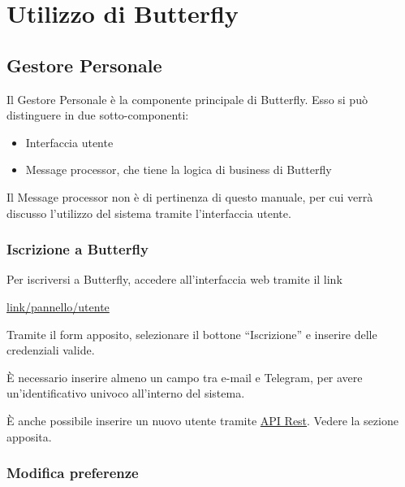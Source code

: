 \section{Utilizzo di Butterfly}\label{utilizzo}


\subsection{Gestore Personale}

Il Gestore Personale è la componente principale di Butterfly. %
Esso si può distinguere in due sotto-componenti:

\begin{itemize}
    \item Interfaccia utente
    \item Message processor, che tiene la logica di business di Butterfly
\end{itemize}

Il Message processor non è di pertinenza di questo manuale, per cui verrà discusso l'utilizzo del sistema tramite
l'interfaccia utente.


\subsubsection{Iscrizione a Butterfly}

Per iscriversi a Butterfly, accedere all'interfaccia web tramite il link

\begin{center}
    \url{link/pannello/utente}
\end{center}

Tramite il form apposito, selezionare il bottone ``Iscrizione'' e inserire delle credenziali valide.

È necessario inserire almeno un campo tra e-mail e Telegram, per avere un'identificativo univoco
all'interno del sistema.

È anche possibile inserire un nuovo utente tramite \hyperref[APIRest]{API Rest}. Vedere la sezione apposita.


\subsubsection{Modifica preferenze}

